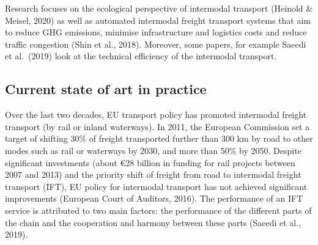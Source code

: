 \documentclass[
]{book}
\begin{document}
Research focuses on the ecological perspective of intermodal transport (Heinold \& Meisel, 2020) as well as automated intermodal freight transport systems that aim to reduce GHG emissions, minimise infrastructure and logistics costs and reduce traffic congestion (Shin et al., 2018). Moreover, some papers, for example Saeedi et al.~(2019) look at the technical efficiency of the intermodal transport.

\hypertarget{current-state-of-art-in-practice-29}{%
\subsection*{Current state of art in practice}\label{current-state-of-art-in-practice-29}}

Over the last two decades, EU transport policy has promoted intermodal freight transport (by rail or inland waterways). In 2011, the European Commission set a target of shifting 30\% of freight transported further than 300 km by road to other modes such as rail or waterways by 2030, and more than 50\% by 2050. Despite significant investments (about €28 billion in funding for rail projects between 2007 and 2013) and the priority shift of freight from road to intermodal freight transport (IFT), EU policy for intermodal transport has not achieved significant improvements (European Court of Auditors, 2016). The performance of an IFT service is attributed to two main factors: the performance of the different parts of the chain and the cooperation and harmony between these parts (Saeedi et al., 2019).
\end{document}
